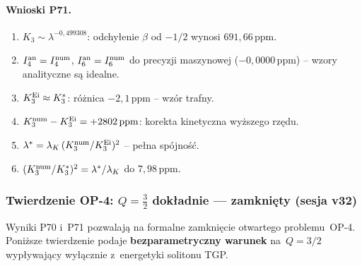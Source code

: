 \paragraph{Wnioski P71.}
\begin{enumerate}
  \item $K_3 \sim \lambda^{-0{,}499308}$: odchy\l{}enie $\beta$ od $-1/2$ wynosi $691{,}66\,\mathrm{ppm}$.
  \item $I_4^{\rm an} = I_4^{\rm num}$, $I_6^{\rm an} = I_6^{\rm num}$ do precyzji maszynowej
        ($-0{,}0000\,\mathrm{ppm}$) -- wzory analityczne s\k{a} idealne.
  \item $K_3^{\rm Ei} \approx K_3^*$: r\'o\.znica $-2{,}1\,\mathrm{ppm}$ -- wz\'or trafny.
  \item $K_3^{\rm num}-K_3^{\rm Ei} = +2802\,\mathrm{ppm}$: korekta kinetyczna wy\.zszego rz\k{e}du.
  \item $\lambda^* = \lambda_K\,(K_3^{\rm num}/K_3^{\rm Ei})^2$ -- pe\l{}na sp\'ojno\'s\'c.
  \item $(K_3^{\rm num}/K_3^*)^2 = \lambda^*/\lambda_K$ do $7{,}98\,\mathrm{ppm}$.
\end{enumerate}

\subsubsection{Twierdzenie OP-4: $Q=\tfrac{3}{2}$ dok\l{}adnie --- zamkni\k{e}ty (sesja v32)}%
\label{app:F-OP4-closure}

Wyniki P70 i~P71 pozwalaj\k{a} na formalne zamkni\k{e}cie otwartego problemu~OP-4.
Poni\.zsze twierdzenie podaje \textbf{bezparametryczny warunek} na~$Q=3/2$
wyp\l{}ywaj\k{a}cy wy\l{}\k{a}cznie z~energetyki solitonu TGP.

